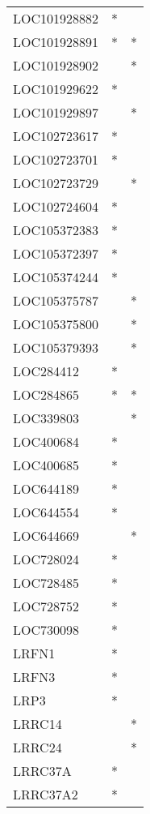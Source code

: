 \begin{longtable}{lcc}
LOC101928882 &         * &         \\
LOC101928891 &         * &       * \\
LOC101928902 &           &       * \\
LOC101929622 &         * &         \\
LOC101929897 &           &       * \\
LOC102723617 &         * &         \\
LOC102723701 &         * &         \\
LOC102723729 &           &       * \\
LOC102724604 &         * &         \\
LOC105372383 &         * &         \\
LOC105372397 &         * &         \\
LOC105374244 &         * &         \\
LOC105375787 &           &       * \\
LOC105375800 &           &       * \\
LOC105379393 &           &       * \\
LOC284412    &         * &         \\
LOC284865    &         * &       * \\
LOC339803    &           &       * \\
LOC400684    &         * &         \\
LOC400685    &         * &         \\
LOC644189    &         * &         \\
LOC644554    &         * &         \\
LOC644669    &           &       * \\
LOC728024    &         * &         \\
LOC728485    &         * &         \\
LOC728752    &         * &         \\
LOC730098    &         * &         \\
LRFN1        &         * &         \\
LRFN3        &         * &         \\
LRP3         &         * &         \\
LRRC14       &           &       * \\
LRRC24       &           &       * \\
LRRC37A      &         * &         \\
LRRC37A2     &         * &         \\

\end{longtable}
